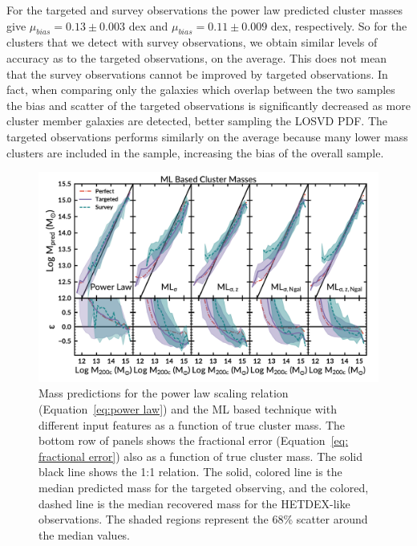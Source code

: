 \documentclass[fleqn,usenatbib]{mnras}
\newcommand{\editorial}[1]{\textcolor{red}{#1}}
\begin{document}

For the targeted and survey observations the power law predicted cluster masses give $\mu_{bias} =0.13\pm{0.003}$ dex and $\mu_{bias} =0.11\pm{0.009}$ dex, respectively. So for the clusters that we detect with survey observations, we obtain similar levels of accuracy as to the targeted observations, on the average. This does not mean that the survey observations cannot be improved by targeted observations. In fact, when comparing only the galaxies which overlap between the two samples the bias and scatter of the targeted observations is significantly decreased as more cluster member galaxies are detected, better sampling the LOSVD PDF. The targeted observations performs similarly on the average because many lower mass clusters are included in the sample, increasing the bias of the overall sample.

\begin{figure} 
	\includegraphics[width=\textwidth]{figures/MLcomparison.pdf} 
	\caption{Mass predictions for the power law scaling relation (Equation~\ref{eq:power law}) and the ML based technique with different input features as a function of true cluster mass. The bottom row of panels shows the fractional error (Equation~\ref{eq: fractional error}) also as a function of true cluster mass. The solid black line shows the 1:1 relation. The solid, colored line is the median predicted mass for the targeted observing, and the colored, dashed line is the median recovered mass for the HETDEX-like observations. The shaded regions represent the 68\% scatter around the median values.} \label{fig: ML comparison} 
\end{figure}
\end{document}
